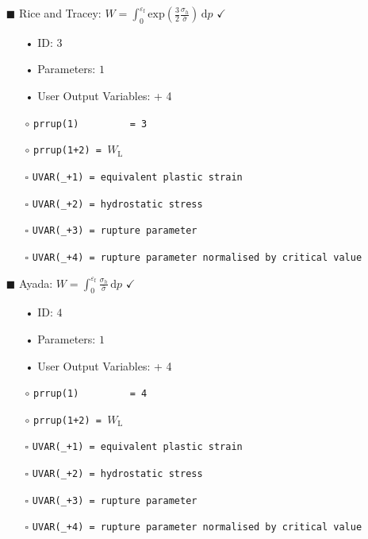 \documentclass[11pt,a4paper,twoside,final,onecolumn,titlepage]{article}
\newcommand{\verified}{\hspace{0.5pt} {\LARGE $\checkmark$}}
\begin{document}
\begin{itemize}
	\item[\tiny$\blacksquare$] Rice and Tracey: $\displaystyle W = \int_{0}^{\varepsilon_\textrm{f}} \text{exp}\left(\frac{3}{2}\frac{\sigma_h}{\bar{\sigma}}\right)\,\text{d}p$ \verified{}
	\begin{itemize}
		\item[•] ID: $3$
		\item[•] Parameters: $1$
		\item[•] User Output Variables: + 4\\
		\item[$\circ$] \texttt{prrup(1)\,\,\,\,\,\,\,\,\,= 3}
		\item[$\circ$] \texttt{prrup(1+2) = $W_\textrm{L}$}\\
		\item[\tiny$\square$] \texttt{UVAR(\_+1) = equivalent plastic strain}
		\item[\tiny$\square$] \texttt{UVAR(\_+2) = hydrostatic stress}
		\item[\tiny$\square$] \texttt{UVAR(\_+3) = rupture parameter}
		\item[\tiny$\square$] \texttt{UVAR(\_+4) = rupture parameter normalised by critical value}\\
	\end{itemize}
\end{itemize}

\pagebreak
\begin{itemize}
	\item[\tiny$\blacksquare$] Ayada: $\displaystyle W =  \int_{0}^{\varepsilon_\textrm{f}}\frac{\sigma_{h}}{\bar{\sigma}}\,\text{d}p$ \verified{}
	\begin{itemize}
		\item[•] ID: $4$
		\item[•] Parameters: $1$
		\item[•] User Output Variables: + 4\\
		\item[$\circ$] \texttt{prrup(1)\,\,\,\,\,\,\,\,\,= 4}
		\item[$\circ$] \texttt{prrup(1+2) = $W_\textrm{L}$}\\
		\item[\tiny$\square$] \texttt{UVAR(\_+1) = equivalent plastic strain}
		\item[\tiny$\square$] \texttt{UVAR(\_+2) = hydrostatic stress}
		\item[\tiny$\square$] \texttt{UVAR(\_+3) = rupture parameter}
		\item[\tiny$\square$] \texttt{UVAR(\_+4) = rupture parameter normalised by critical value}\\
	\end{itemize}
\end{itemize}
\end{document}
